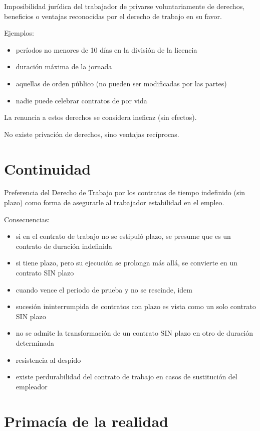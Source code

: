 \documentclass[spanish,12pt,a4paper,titlepage]{report}
\begin{document}
Imposibilidad jurídica del trabajador de privarse voluntariamente de derechos, beneficios o ventajas reconocidas por el derecho de trabajo en su favor. 

Ejemplos:
\begin{itemize}
\item períodos no menores de 10 días en la división de la licencia
\item duración máxima de la jornada
\item aquellas de orden público (no pueden ser modificadas por las partes)
\item nadie puede celebrar contratos de por vida

\end{itemize}

La renuncia a estos derechos se considera ineficaz (sin efectos).

No existe privación de derechos, sino ventajas recíprocas.

\section{Continuidad}

Preferencia del Derecho de Trabajo por los contratos de tiempo indefinido (sin plazo) como forma de asegurarle al trabajador estabilidad en el empleo.

Consecuencias:
\begin{itemize}
\item si en el contrato de trabajo no se estipuló plazo, se presume que es un contrato de duración indefinida 
\item si tiene plazo, pero su ejecución se prolonga más allá, se convierte en un contrato SIN  plazo
\item cuando vence el periodo de prueba y no se rescinde, idem
\item sucesión ininterrumpida de contratos con plazo es vista como un solo contrato SIN plazo
\item no se admite la transformación de un contrato SIN plazo en otro de duración determinada
\item resistencia al despido
\item existe perdurabilidad del contrato de trabajo en casos de sustitución del empleador 
\end{itemize}


\section{Primacía de la realidad}
\end{document}

